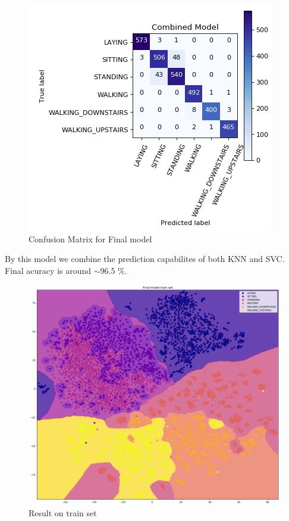 \documentclass[12pt]{article}
\begin{document}
\begin{figure}[H]
	\centering
	\includegraphics[scale=0.450]{combo.png}
	\caption{Confusion Matrix for Final model}
\end{figure}
By this model we combine the prediction capabilites of both KNN and SVC. Final acuracy is around $\sim$96.5 $\%$.
\begin{figure}[H]
	\centering
	\includegraphics[scale=0.30]{result_train.png}
	\caption{Result on train set}
\end{figure}\noindent
\end{document}
